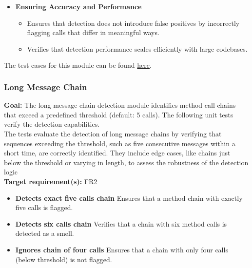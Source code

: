\documentclass[12pt, titlepage]{article}
\begin{document}
\begin{enumerate}[label={\bf \textcolor{Maroon}{test-SRT-\arabic*}}, wide=0pt, font=\itshape]
\begin{itemize}
    \item \textbf{Ensuring Accuracy and Performance}
    \begin{itemize}
        \item Ensures that detection does not introduce false positives by incorrectly flagging calls that differ in meaningful ways.
        \item Verifies that detection performance scales efficiently with large codebases.
    \end{itemize}
\end{itemize}

\noindent The test cases for this module can be found \href{https://github.com/ssm-lab/capstone--source-code-optimizer/blob/new-poc/tests/analyzers/test_detect_repeated_calls.py}{here}.

\subsubsection{Long Message Chain}

\textbf{Goal:} The long message chain detection module identifies method call chains that exceed a predefined threshold (default: 5 calls). The following unit tests verify the detection capabilities. \\

\noindent The tests evaluate the detection of long message chains by verifying that sequences exceeding the threshold, such as five consecutive messages within a short time, are correctly identified. They include edge cases, like chains just below the threshold or varying in length, to assess the robustness of the detection logic\\

\noindent\textbf{Target requirement(s):} FR2 ~\cite{SRS} \\

\begin{itemize}
    \item \textbf{Detects exact five calls chain} \newline
    Ensures that a method chain with exactly five calls is flagged.
    
    \item \textbf{Detects six calls chain} \newline
    Verifies that a chain with six method calls is detected as a smell.
    
    \item \textbf{Ignores chain of four calls} \newline
    Ensures that a chain with only four calls (below threshold) is not flagged.
    

\end{itemize}
\end{enumerate}
\end{document}
